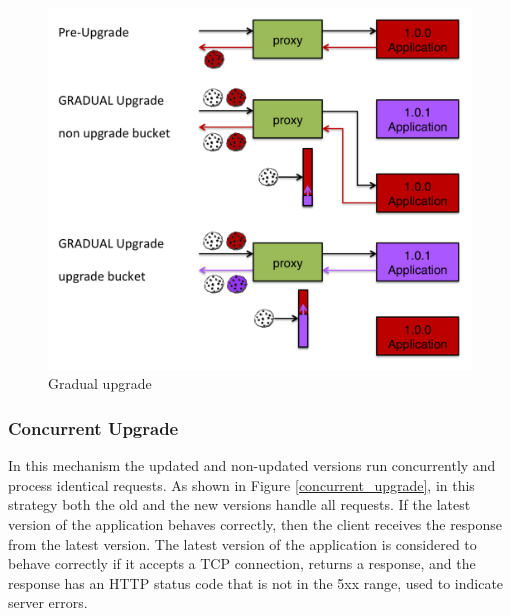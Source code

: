 \documentclass[a4paper,11pt,twoside]{report}
\begin{document}
\begin{figure}[!ht]
  \centering
     \includegraphics[scale=0.30]{gradual_upgrade}
  \caption{Gradual upgrade}
  \label{gradual_upgrade}
\end{figure}

\subsubsection*{Concurrent Upgrade}
In this mechanism the updated and non-updated versions run concurrently and process identical requests.  As shown in Figure \ref{concurrent_upgrade}, in this strategy both the old and the new versions handle all requests.  If the latest version of the application behaves correctly, then the client receives the response from the latest version.  The latest version of the application is considered to behave correctly if it accepts a TCP connection, returns a response, and the response has an HTTP status code that is not in the 5xx range, used to indicate server errors.
   
\end{document}
